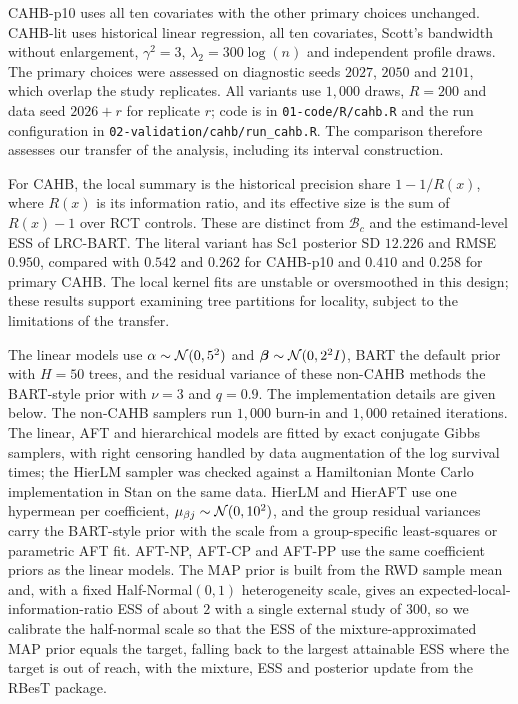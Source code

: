 CAHB-p10 uses all ten covariates with the other primary choices unchanged. CAHB-lit uses historical linear regression, all ten covariates, Scott's bandwidth without enlargement, $\gamma^2=3$, $\lambda_2=300\log(n)$ and independent profile draws. The primary choices were assessed on diagnostic seeds $2027$, $2050$ and $2101$, which overlap the study replicates. All variants use $1{,}000$ draws, $R=200$ and data seed $2026+r$ for replicate $r$; code is in \texttt{01-code/R/cahb.R} and the run configuration in \texttt{02-validation/cahb/run\_cahb.R}. The comparison therefore assesses our transfer of the analysis, including its interval construction.

For CAHB, the local summary is the historical precision share $1-1/R(x)$, where $R(x)$ is its information ratio, and its effective size is the sum of $R(x)-1$ over RCT controls. These are distinct from $\mathcal B_c$ and the estimand-level ESS of LRC-BART. The literal variant has Sc1 posterior SD $12.226$ and RMSE $0.950$, compared with $0.542$ and $0.262$ for CAHB-p10 and $0.410$ and $0.258$ for primary CAHB. The local kernel fits are unstable or oversmoothed in this design; these results support examining tree partitions for locality, subject to the limitations of the transfer.




The linear models use $\alpha\sim\mathcal{N}(0,5^2)$ and $\bm\beta\sim\mathcal{N}(0,2^2I)$, BART the default prior with $H=50$ trees, and the residual variance of these non-CAHB methods the BART-style prior with $\nu=3$ and $q=0.9$. The implementation details are given below. The non-CAHB samplers run $1{,}000$ burn-in and $1{,}000$ retained iterations. The linear, AFT and hierarchical models are fitted by exact conjugate Gibbs samplers, with right censoring handled by data augmentation of the log survival times; the HierLM sampler was checked against a Hamiltonian Monte Carlo implementation in Stan on the same data. HierLM and HierAFT use one hypermean per coefficient, $\mu_{\beta j}\sim\mathcal{N}(0,10^2)$, and the group residual variances carry the BART-style prior with the scale from a group-specific least-squares or parametric AFT fit. AFT-NP, AFT-CP and AFT-PP use the same coefficient priors as the linear models. The MAP prior is built from the RWD sample mean and, with a fixed Half-Normal$(0,1)$ heterogeneity scale, gives an expected-local-information-ratio ESS of about $2$ with a single external study of $300$, so we calibrate the half-normal scale so that the ESS of the mixture-approximated MAP prior equals the target, falling back to the largest attainable ESS where the target is out of reach, with the mixture, ESS and posterior update from the RBesT package.

